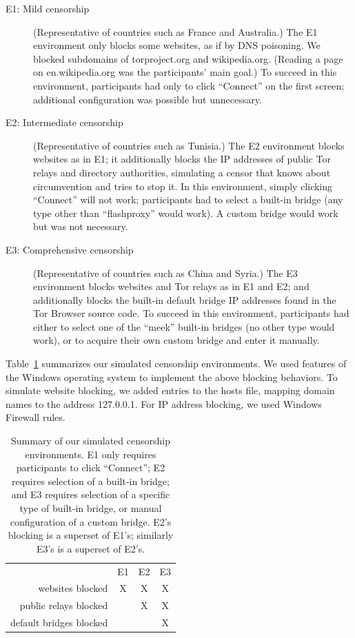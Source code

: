 \documentclass[USenglish,oneside,twocolumn]{article}
\begin{document}
\begin{description}
\item[E1: Mild censorship]
(Representative of countries such as France and Australia.)
The E1 environment only blocks some websites,
as if by DNS poisoning.
We blocked subdomains of torproject.org
and wikipedia.org.
(Reading a page on en.wikipedia.org was the participants' main goal.)
To succeed in this environment,
participants had only to click ``Connect'' on the first screen;
additional configuration was possible but unnecessary.

\item[E2: Intermediate censorship]
(Representative of countries such as Tunisia.)
The E2 environment blocks websites as in E1;
it additionally blocks the IP addresses of public Tor relays
and directory authorities, simulating a censor that knows
about circumvention and tries to stop it.
In this environment, simply clicking ``Connect'' will not work;
participants had to select a built-in bridge
(any type other than ``flashproxy'' would work).
A custom bridge would work but was not necessary.

\item[E3: Comprehensive censorship]
(Representative of countries such as China and Syria.)
The E3 environment blocks websites and Tor relays as in E1 and E2;
and additionally blocks the built-in default bridge IP addresses
found in the Tor Browser source code.
To succeed in this environment, participants had either to select
one of the ``meek'' built-in bridges (no other type would work),
or to acquire their own custom bridge and enter it manually.
\end{description}

\smallskip

Table~\ref{tab:environments} summarizes our simulated censorship
environments. We used features of the Windows operating system 
to implement the above blocking behaviors.
To simulate website blocking, we added entries to the hosts file,
mapping domain names to the address 127.0.0.1.
For IP address blocking, we used Windows Firewall rules.

\begin{table}
\centering
\begin{tabular}{r c c c}
& E1 & E2 & E3 \\
websites blocked & X & X & X \\
public relays blocked & & X & X \\
default bridges blocked & & & X \\
\end{tabular}
\caption{
Summary of our simulated censorship environments.
E1 only requires participants to click ``Connect'';
E2 requires selection of a built-in bridge;
and E3 requires selection of a specific type of built-in bridge,
or manual configuration of a custom bridge.
E2's blocking is a superset of E1's;
similarly E3's is a superset of E2's.
}
\label{tab:environments}
\end{table}
\end{document}
